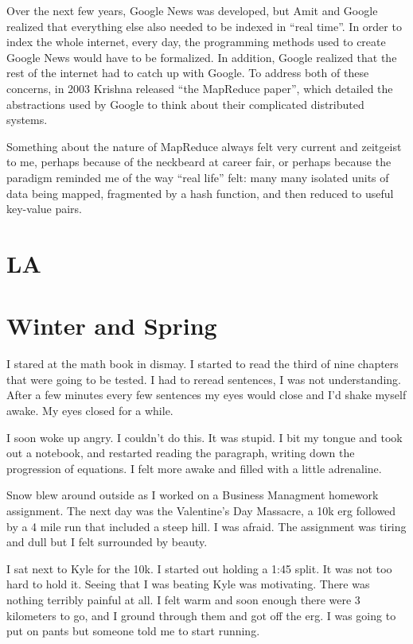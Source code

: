 Over the next few years, Google News was developed, but Amit and Google realized
that everything else also needed to be indexed in ``real time''.  In order to
index the whole internet, every day, the programming methods used to create
Google News would have to be formalized.  In addition, Google realized that the
rest of the internet had to catch up with Google.  To address both of these
concerns, in 2003 Krishna released ``the MapReduce paper'', which detailed the
abstractions used by Google to think about their complicated distributed
systems.  

Something about the nature of MapReduce always felt very current and zeitgeist
to me, perhaps because of the neckbeard at career fair, or perhaps because the
paradigm reminded me of the way ``real life'' felt: many many isolated units of
data being mapped, fragmented by a hash function, and then reduced to useful
key-value pairs.


\chapter{LA}


\chapter{Winter and Spring}

I stared at the math book in dismay.  I started to read the third of nine
chapters that were going to be tested.  I had to reread sentences, I was
not understanding.  After a few minutes every few sentences my eyes would close
and I'd shake myself awake.  My eyes closed for a while.

I soon woke up angry.  I couldn't do this.  It was stupid.  I bit my tongue and
took out a notebook, and restarted reading the paragraph, writing down the
progression of equations.  I felt more awake and filled with a little
adrenaline.   

Snow blew around outside as I worked on a Business Managment homework
assignment.  The next day was the Valentine's Day Massacre, a 10k erg followed
by a 4 mile run that included a steep hill.  I was afraid.  The assignment was
tiring and dull but I felt surrounded by beauty.

I sat next to Kyle for the 10k.  I started out holding a 1:45 split.  It
was not too hard to hold it.  Seeing that I was beating Kyle was motivating.
There was nothing terribly painful at all.  I felt warm and soon enough there
were 3 kilometers to go, and I ground through them and got off the erg.  I was
going to put on pants but someone told me to start running.

